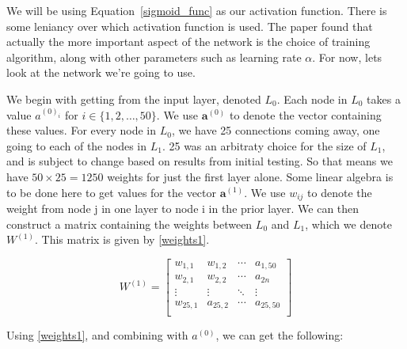 We will be using Equation~\ref{sigmoid_func} as our activation function. There is some leniancy over which activation function is used. The paper \cite{sibi} found that actually the more important aspect of 
the network is the choice of training algorithm, along with other parameters such as learning rate $\alpha$. For now, lets look at the network we're going to use. 

We begin with getting from the input layer, denoted $L_0$. Each node in $L_0$ takes a value $a^{(0)_i}$ for $i \in \{1,2,\ldots,50\}$. We use $\textbf{a}^{(0)}$ to denote the vector
containing these values. For every node in $L_0$, we have 25 connections coming away, one going to each of the nodes in $L_1$. 25 was an arbitraty choice for the size of $L_1$, and is
subject to change based on results from initial testing. So that means we have $50 \times 25 = 1250$ weights for just the first layer alone. Some linear algebra is to be done here to get 
values for the vector $\textbf{a}^{(1)}$. We use $w_{ij}$ to denote the weight from node j in one layer to node i in the prior layer. We can then construct a matrix containing the weights
between $L_0$ and $L_1$, which we denote $W^{(1)}$. This matrix is given by \ref{weights1}.

\begin{equation}
    W^{(1)} =
    \left[ {\begin{array}{cccc}
      w_{1,1} & w_{1,2} & \cdots & a_{1,50}\\
      w_{2,1} & w_{2,2} & \cdots & a_{2n}\\
      \vdots & \vdots & \ddots & \vdots\\
      w_{25,1} & a_{25,2} & \cdots & a_{25,50}\\
    \end{array} } \right]
    \label{weights1}
\end{equation}

Using \ref{weights1}, and combining with $a^{(0)}$, we can get the following:

